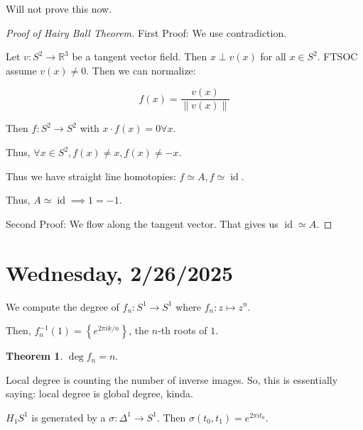 \documentclass{article}
\theoremstyle{definition}
\newtheorem{theorem}{Theorem}
\begin{document}
    Will not prove this now.

    \begin{proof}
        [Proof of Hairy Ball Theorem]

        First Proof: We use contradiction.
        
        Let \(v: S^2 \to \mathbb{R}^3\) be a tangent vector field. Then \(x \perp v(x)\) for all \(x\in S^2\). FTSOC assume \(v(x) \neq 0\). Then we can normalize:

        \[
            f(x) = \frac{v(x)}{\lVert v(x) \rVert}
        \]

        Then \(f: S^2 \to S^2\) with \(x \cdot f(x) = 0 \forall x\).

        Thus, \(\forall x\in S^2, f(x) \neq x, f(x) \neq -x\).

        Thus we have straight line homotopies: \(f\simeq A, f\simeq \operatorname{id}\).

        Thus, \(A \simeq \operatorname{id} \implies 1 = -1\).

        Second Proof: We flow along the tangent vector. That gives us \(\operatorname{id}\simeq A\).

    \end{proof}

    \section*{Wednesday, 2/26/2025}
    
    We compute the degree of \(f_n: S^1 \to S^1\) where \(f_n: z \mapsto z^n\).

    Then, \(f_n ^{-1} (1) = \left\{ e^{2\pi i k / n} \right\} \), the \(n\)-th roots of \(1\).

    \begin{theorem}
        \(\deg f_n = n\). 
    \end{theorem}

    Local degree is counting the number of inverse images. So, this is essentially saying: local degree is global degree, kinda.

    \(H_1 S^1\) is generated by a \(\sigma: \Delta^1 \to S^1\). Then \(\sigma(t_0,t_1) = e^{2\pi i t_0}\).
\end{document}
